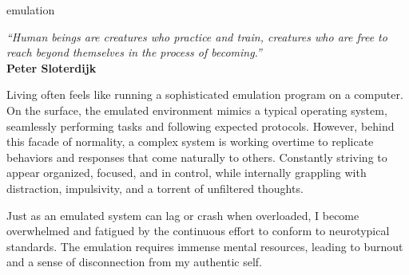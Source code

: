 



\begin{center}
\vspace*{\fill}
\Huge{emulation}

\vspace{2cm}

\begin{flushright}
\large{
\textit{ “Human beings are creatures who practice and train, creatures who are free to reach beyond themselves in the process of becoming.”}\\
\textbf{ Peter Sloterdijk }}
\end{flushright}

\vspace*{\fill}
\end{center}


Living often feels like running a sophisticated emulation program on a computer. On the surface, the emulated environment mimics a typical operating system, seamlessly performing tasks and following expected protocols. However, behind this facade of normality, a complex system is working overtime to replicate behaviors and responses that come naturally to others. Constantly striving to appear organized, focused, and in control, while internally grappling with distraction, impulsivity, and a torrent of unfiltered thoughts.

Just as an emulated system can lag or crash when overloaded, I become overwhelmed and fatigued by the continuous effort to conform to neurotypical standards. The emulation requires immense mental resources, leading to burnout and a sense of disconnection from my authentic self.
